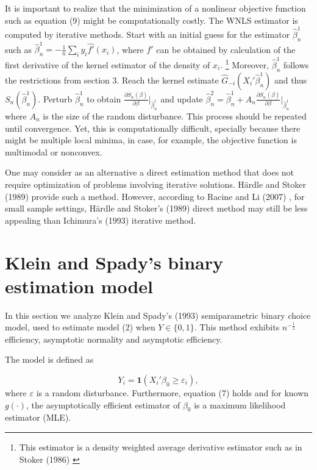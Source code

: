 \documentclass[a4paper]{article}
\begin{document}
It is important to realize that the minimization of a nonlinear objective function such as equation (9) might be computationally costly. The WNLS estimator is computed by iterative methods. Start with an initial guess for the estimator $\hat{\beta}_n^{1}$ such as $\hat{\beta}_n^{1} = - \frac{1}{n}\sum_i y_i\hat{f'}(x_i)$, where $f'$ can be obtained by calculation of the first derivative of the kernel estimator of the density of $x_i$. \footnote{This estimator is a density weighted average derivative estimator such as in Stoker (1986) \cite{[21]}} Moreover, $\hat{\beta}_n^{1}$ follows the restrictions from section 3. Reach the kernel estimate $\hat{G}_{-i}(X_i'\hat{\beta}_n^{1})$ and thus $S_n(\hat{\beta}_n^{1})$. Perturb $\hat{\beta}_n^{1}$ to obtain $\frac{\partial S_n(\beta)}{\partial\beta} |_{\hat{\beta}_n^{1}}$ and update $\hat{\beta}_n^{2} = \hat{\beta}_n^{1} + A_n  \frac{ \partial S_n(\beta)}{\partial\beta}|_{\hat{\beta}_n^{1}}$ where $A_n$ is the size of the random disturbance. This process should be repeated until convergence. Yet, this is computationally difficult, specially because there might be multiple local minima, in case, for example, the objective function is multimodal or nonconvex. 

One may consider  as an alternative a direct estimation method that does not require optimization of problems involving iterative solutions.  H{\"a}rdle and Stoker (1989) \cite{[22]} provide such a method. However, according to Racine and Li (2007) \cite{[1]}, for small sample settings, H{\"a}rdle and Stoker's (1989) \cite{[22]} direct method may still be less appealing than Ichimura's (1993) \cite{[6]} iterative method.

\section{Klein and Spady's binary estimation model} %
\label{sec:section_about_references_within_the_document}
In this section we analyze Klein and Spady's (1993) \cite{[12]} semiparametric binary choice model, used to estimate model (2) when $Y \in \{0,1\}$.   This method exhibits $n^{-\frac{1}{2}}$ efficiency, asymptotic normality and asymptotic efficiency. 

The model is defined as

\begin{equation}
Y_i =  \mathbf{1}{(X_i'\beta_0 \geq \varepsilon_i)},
\end{equation}
where $\varepsilon$ is a random disturbance. Furthermore, equation (7) holds and for known $g(\cdot)$, the asymptotically efficient estimator of $\beta_0$ is a maximum likelihood estimator (MLE). 
\end{document}
